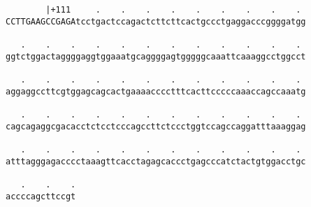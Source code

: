 \documentclass{article}
\begin{document}
\begin{Verbatim}
        |+111     .    .    .    .    .    .    .    .    . 
CCTTGAAGCCGAGAtcctgactccagactcttcttcactgccctgaggacccggggatgg
                                                            
   .    .    .    .    .    .    .    .    .    .    .    . 
ggtctggactaggggaggtggaaatgcaggggagtgggggcaaattcaaaggcctggcct
                                                            
   .    .    .    .    .    .    .    .    .    .    .    . 
aggaggccttcgtggagcagcactgaaaacccctttcacttcccccaaaccagccaaatg
                                                            
   .    .    .    .    .    .    .    .    .    .    .    . 
cagcagaggcgacacctctcctcccagccttctccctggtccagccaggatttaaaggag
                                                            
   .    .    .    .    .    .    .    .    .    .    .    . 
atttagggagacccctaaagttcacctagagcaccctgagcccatctactgtggacctgc
                                                            
   .    .    .
accccagcttccgt
              
              
\end{Verbatim}
\end{document}
